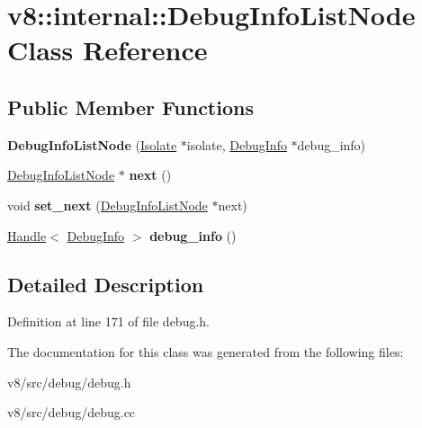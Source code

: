 \hypertarget{classv8_1_1internal_1_1DebugInfoListNode}{}\section{v8\+:\+:internal\+:\+:Debug\+Info\+List\+Node Class Reference}
\label{classv8_1_1internal_1_1DebugInfoListNode}
\subsection*{Public Member Functions}
\begin{DoxyCompactItemize}
\item 
\mbox{\label{classv8_1_1internal_1_1DebugInfoListNode_aed5ae528d9f2067c2d064371d0508575}} 
{\bfseries Debug\+Info\+List\+Node} (\mbox{\hyperlink{classv8_1_1internal_1_1Isolate}{Isolate}} $\ast$isolate, \mbox{\hyperlink{classv8_1_1internal_1_1DebugInfo}{Debug\+Info}} $\ast$debug\+\_\+info)
\item 
\mbox{\label{classv8_1_1internal_1_1DebugInfoListNode_a94d33d31212f6abebe43b36662bbc6c0}} 
\mbox{\hyperlink{classv8_1_1internal_1_1DebugInfoListNode}{Debug\+Info\+List\+Node}} $\ast$ {\bfseries next} ()
\item 
\mbox{\label{classv8_1_1internal_1_1DebugInfoListNode_a736b7fd7b611bdc285125fa76ede956b}} 
void {\bfseries set\+\_\+next} (\mbox{\hyperlink{classv8_1_1internal_1_1DebugInfoListNode}{Debug\+Info\+List\+Node}} $\ast$next)
\item 
\mbox{\label{classv8_1_1internal_1_1DebugInfoListNode_ad815860a8e9b66ba266340e4870f4489}} 
\mbox{\hyperlink{classv8_1_1internal_1_1Handle}{Handle}}$<$ \mbox{\hyperlink{classv8_1_1internal_1_1DebugInfo}{Debug\+Info}} $>$ {\bfseries debug\+\_\+info} ()
\end{DoxyCompactItemize}


\subsection{Detailed Description}


Definition at line 171 of file debug.\+h.



The documentation for this class was generated from the following files\+:\begin{DoxyCompactItemize}
\item 
v8/src/debug/debug.\+h\item 
v8/src/debug/debug.\+cc\end{DoxyCompactItemize}
